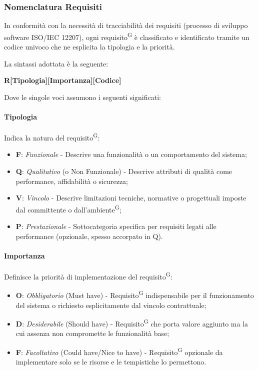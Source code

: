 \documentclass[a4paper, 11pt]{article}
\begin{document}
\subsubsection{Nomenclatura Requisiti}
In conformità con la necessità di tracciabilità dei requisiti (processo di sviluppo software ISO/IEC 12207), ogni requisito\textsuperscript{G} è classificato e identificato tramite un codice univoco che ne esplicita la tipologia e la priorità.

La sintassi adottata è la seguente:

\begin{center}
    \textbf{R[Tipologia][Importanza][Codice]}
\end{center}

Dove le singole voci assumono i seguenti significati:

\paragraph{Tipologia}
Indica la natura del requisito\textsuperscript{G}:
\begin{itemize}
    \item \textbf{F}: \textit{Funzionale} - Descrive una funzionalità o un comportamento del sistema;
    \item \textbf{Q}: \textit{Qualitativo} (o Non Funzionale) - Descrive attributi di qualità come performance, affidabilità o sicurezza;
    \item \textbf{V}: \textit{Vincolo} - Descrive limitazioni tecniche, normative o progettuali imposte dal committente o dall'ambiente\textsuperscript{G};
    \item \textbf{P}: \textit{Prestazionale} - Sottocategoria specifica per requisiti legati alle performance (opzionale, spesso accorpato in Q).
\end{itemize}

\paragraph{Importanza}
Definisce la priorità di implementazione del requisito\textsuperscript{G}:
\begin{itemize}
    \item \textbf{O}: \textit{Obbligatorio} (Must have) - Requisito\textsuperscript{G} indispensabile per il funzionamento del sistema o richiesto esplicitamente dal vincolo contrattuale;
    \item \textbf{D}: \textit{Desiderabile} (Should have) - Requisito\textsuperscript{G} che porta valore aggiunto ma la cui assenza non compromette le funzionalità base;
    \item \textbf{F}: \textit{Facoltativo} (Could have/Nice to have) - Requisito\textsuperscript{G} opzionale da implementare solo se le risorse e le tempistiche lo permettono.
\end{itemize}
\end{document}
